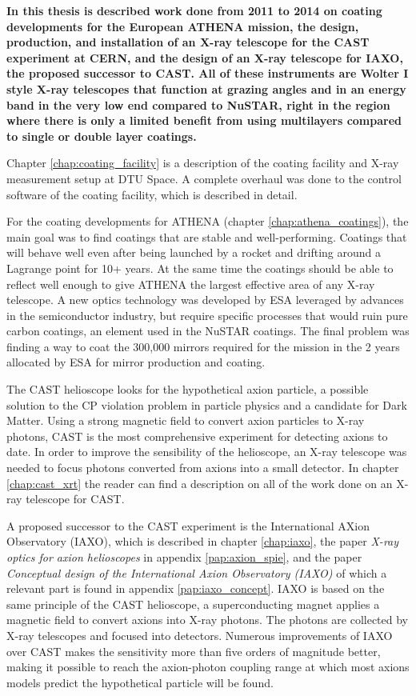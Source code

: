 {\bf In this thesis is described work done from 2011 to 2014 on coating developments for the European ATHENA mission, the design, production, and installation of an X-ray telescope for the CAST experiment at CERN, and the design of an X-ray telescope for IAXO, the proposed successor to CAST. All of these instruments are Wolter I style X-ray telescopes that function at grazing angles and in an energy band in the very low end compared to NuSTAR, right in the region where there is only a limited benefit from using multilayers compared to single or double layer coatings. }

Chapter \ref{chap:coating_facility} is a description of the coating facility and X-ray measurement setup at DTU Space. A complete overhaul was done to the control software of the coating facility, which is described in detail.

For the coating developments for ATHENA (chapter \ref{chap:athena_coatings}), the main goal was to find coatings that are stable and well-performing. Coatings that will behave well even after being launched by a rocket and drifting around a Lagrange point for 10+ years. At the same time the coatings should be able to reflect well enough to give ATHENA the largest effective area of any X-ray telescope. A new optics technology was developed by ESA leveraged by advances in the semiconductor industry, but require specific processes that would ruin pure carbon coatings, an element used in the NuSTAR coatings. The final problem was finding a way to coat the 300,000 mirrors required for the mission in the 2 years allocated by ESA for mirror production and coating.

The CAST helioscope looks for the hypothetical axion particle, a possible solution to the CP violation problem in particle physics and a candidate for Dark Matter. Using a strong magnetic field to convert axion particles to X-ray photons, CAST is the most comprehensive experiment for detecting axions to date. In order to improve the sensibility of the helioscope, an X-ray telescope was needed to focus photons converted from axions into a small detector. In chapter \ref{chap:cast_xrt} the reader can find a description on all of the work done on an X-ray telescope for CAST.

A proposed successor to the CAST experiment is the International AXion Observatory (IAXO), which is described in chapter \ref{chap:iaxo}, the paper \emph{X-ray optics for axion helioscopes} in appendix \ref{pap:axion_spie}, and the paper \emph{Conceptual design of the International Axion Observatory (IAXO)} of which a relevant part is found in appendix \ref{pap:iaxo_concept}. IAXO is based on the same principle of the CAST helioscope, a superconducting magnet applies a magnetic field to convert axions into X-ray photons. The photons are collected by X-ray telescopes and focused into detectors. Numerous improvements of IAXO over CAST makes the sensitivity more than five orders of magnitude better, making it possible to reach the axion-photon coupling range at which most axions models predict the hypothetical particle will be found.

